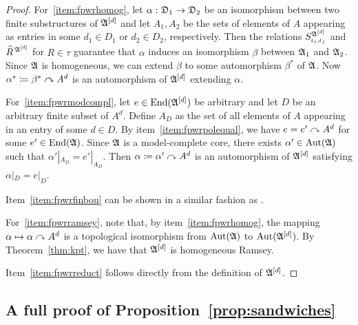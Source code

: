 \begin{proof}
        For~\eqref{item:fpwrhomog}, let $\alpha:\mathfrak{D}_1\to\mathfrak{D}_2$ be an isomorphism between two finite substructures of ${\mathfrak{A}}^{[d]}$ and let $A_1,A_2$ be the sets of elements of $A$ appearing as entries in some $d_1\in D_1$ or $d_2\in D_2$, respectively.
        Then the relations $S^{{\mathfrak{A}}^{[d]}}_{\iota_i,\iota_j}$ and $\widehat{R}^{\,{\mathfrak{A}}^{[d]}}$ for $R\in\tau$ guarantee that $\alpha$ induces an isomorphism $\beta$ between $\mathfrak{A}_1$ and $\mathfrak{A}_2$.
        Since $\mathfrak{A}$ is homogeneous, we can extend $\beta$ to some automorphism $\beta^\ast$ of $\mathfrak{A}$.
        Now $\alpha^\ast\mathrel{\mathop:}\mathrel{\mkern-1.2mu}=\beta^\ast\curvearrowright A^d$ is an automorphism of ${\mathfrak{A}}^{[d]}$ extending $\alpha$.
        
        For~\eqref{item:fpwrmodcompl}, let $e\in \mathrm{End}({\mathfrak{A}}^{[d]})$ be arbitrary and let $D$ be an arbitrary finite subset of $A^d$.
        Define $A_D$ as the set of all elements of $A$ appearing in an entry of some $d\in D$.
        By item~\eqref{item:fpwrpolequal}, we have $e=e'\curvearrowright A^d$ for some $e'\in\mathrm{End}(\mathfrak{A})$.
        Since $\mathfrak{A}$ is a model-complete core, there exists $\alpha'\in\mathrm{Aut}(\mathfrak{A})$ such that $\alpha'|_{A_D}=e'|_{A_D}$.
        Then $\alpha\mathrel{\mathop:}\mathrel{\mkern-1.2mu}=\alpha'\curvearrowright A^d$ is an automorphism of ${\mathfrak{A}}^{[d]}$ satisfying $\alpha|_{D}=e|_{D}$. 
        
        Item~\eqref{item:fpwrfinbou} can be shown in a similar fashion as \cite[Lemma~3.5.4]{bodirsky2021complexity}.
        
        For~\eqref{item:fpwrramsey}, note that, by item~\eqref{item:fpwrhomog}, the mapping $\alpha \mapsto \alpha \curvearrowright A^d$ is a topological isomorphism from $\mathrm{Aut}(\mathfrak{A})$ to $\mathrm{Aut}({\mathfrak{A}}^{[d]})$. 
        By Theorem~\ref{thm:kpt}, we have that ${\mathfrak{A}}^{[d]}$ is homogeneous Ramsey.
        
        Item~\eqref{item:fpwrreduct} follows directly from the definition of ${\mathfrak{A}}^{[d]}$.
    \end{proof} 
 
 

 


\subsection{A full proof of Proposition~\ref{prop:sandwiches}}

\sandwiches*

